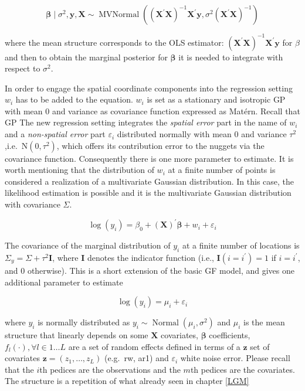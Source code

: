 \documentclass[
  12pt,
  a4paper,
  oneside]{book}
\theoremstyle{definition}
\theoremstyle{definition}
\theoremstyle{definition}
\theoremstyle{remark}
\begin{document}
\[
\boldsymbol{\beta} \mid \sigma^{2}, \boldsymbol{y}, \boldsymbol{X} \sim \operatorname{MVNormal}\left(\left(\boldsymbol{X}^{\prime} \boldsymbol{X}\right)^{-1} \boldsymbol{X}^{\prime} \boldsymbol{y}, \sigma^{2}\left(\boldsymbol{X}^{\prime} \boldsymbol{X}\right)^{-1}\right)
\]

where the mean structure corresponds to the OLS estimator: \(\left(\boldsymbol{X}^{\prime} \boldsymbol{X}\right)^{-1} \boldsymbol{X}^{\prime} \boldsymbol{y}\) for \(\beta\) and then to obtain the marginal posterior for \(\boldsymbol{\beta}\) it is needed to integrate with respect to \(\sigma^2\).

In order to engage the spatial coordinate components into the regression setting \(w_{i}\) has to be added to the equation. \(w_{i}\) is set as a stationary and isotropic GP with mean 0 and variance as covariance function expressed as Matérn.
Recall that GP
The new regression setting integrates the \emph{spatial error} part in the name of \(w_{i}\) and a \emph{non-spatial error} part \(\varepsilon_{i}\) distributed normally with mean 0 and variance \(\tau^2\) ,i.e.~\(\mathrm{N}\left(0, \tau^{2}\right)\), which offers its contribution error to the nuggets via the covariance function.
Consequently there is one more parameter to estimate. It is worth mentioning that the distribution of \(w_{i}\) at a finite number of points is considered a realization of a multivariate Gaussian distribution. In this case, the likelihood estimation is possible and it is the multivariate Gaussian distribution with covariance \(\Sigma\).

\[
\log(y_{i})= \beta_{0} + (\mathbf{X})^{\prime}\boldsymbol{\beta}+w_{i}+\varepsilon_{i}
\]

The covariance of the marginal distribution of \(y_{i}\) at a finite number of locations is \(\Sigma_{y} = \Sigma + \tau^2\mathbf{I}\), where \(\mathbf{I}\) denotes the indicator function (i.e., \(\mathbf{I}(i = i^{\prime})= 1\) if \(i = i^{\prime}\), and 0 otherwise). This is a short extension of the basic GF model, and gives one additional parameter to estimate

\begin{equation}
    \log(y_{i})=\mu_{i}+\varepsilon_{i}
\label{eq:genreg}
\end{equation}

where \(y_{i}\) is normally distributed as \(y_{i} \sim \operatorname{Normal}\left(\mu_{i}, \sigma^{2}\right)\) and \(\mu_{i}\) is the mean structure that linearly depends on some \(\mathbf{X}\) covariates, \(\boldsymbol{\beta}\) coefficients, \(f_{l}(\cdot), \forall l \in 1 \ldots L\) are a set of random effects defined in terms of a \(\boldsymbol{z}\) set of covariates \(\boldsymbol{z}=\left(z_{1}, \ldots, z_{L}\right)\) (e.g.~rw, ar1) and \(\varepsilon_{i}\) white noise error. Please recall that the \(i\)th pedices are the observations and the \(m\)th pedices are the covariates. The structure is a repetition of what already seen in chapter \ref{LGM}
\end{document}
